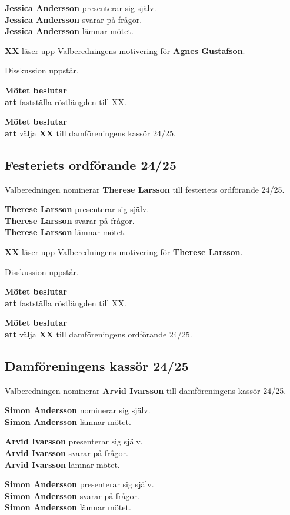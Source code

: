 \documentclass{datateknologsektionen-document}
\newcommand{\ind}{\hspace*{2em}}
\newcommand{\motetbeslutar}{\textbf{Mötet beslutar}}
\newcommand{\att}{\\\ind\textbf{att}}
\begin{document}
\textbf{Jessica Andersson} presenterar sig själv.\\
\textbf{Jessica Andersson} svarar på frågor.\\
\textbf{Jessica Andersson} lämnar mötet.

\textbf{XX} läser upp Valberedningens motivering för \textbf{Agnes Gustafson}.


Disskussion uppstår.

\motetbeslutar
\att{} fastställa röstlängden till XX.

\motetbeslutar
\att{} välja \textbf{XX} till damföreningens kassör 24/25.

\subsection{Festeriets ordförande 24/25}

Valberedningen nominerar \textbf{Therese Larsson} till festeriets ordförande 24/25.

\textbf{Therese Larsson} presenterar sig själv.\\
\textbf{Therese Larsson} svarar på frågor.\\
\textbf{Therese Larsson} lämnar mötet.

\textbf{XX} läser upp Valberedningens motivering för \textbf{Therese Larsson}.

Disskussion uppstår.

\motetbeslutar
\att{} fastställa röstlängden till XX.

\motetbeslutar
\att{} välja \textbf{XX} till damföreningens ordförande 24/25.

\subsection{Damföreningens kassör 24/25}

Valberedningen nominerar \textbf{Arvid Ivarsson} till damföreningens kassör 24/25.

\textbf{Simon Andersson} nominerar sig själv. \\
\textbf{Simon Andersson} lämnar mötet.

\textbf{Arvid Ivarsson} presenterar sig själv.\\
\textbf{Arvid Ivarsson} svarar på frågor.\\
\textbf{Arvid Ivarsson} lämnar mötet.

\textbf{Simon Andersson} presenterar sig själv.\\
\textbf{Simon Andersson} svarar på frågor.\\
\textbf{Simon Andersson} lämnar mötet.
\end{document}
